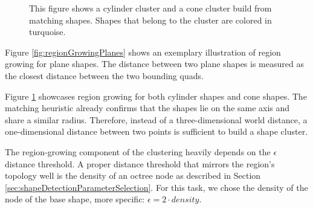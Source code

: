 \begin{figure}
\centering
{}
    \caption[Exemplary cylinder and clone cluster]
        {This figure shows a cylinder cluster and a cone cluster build from matching shapes. Shapes that belong to the cluster are colored in turquoise.}
    \label{fig:regionGrowingConeCylinder}
\end{figure}

Figure \ref{fig:regionGrowingPlanes} shows an exemplary illustration of region growing for plane shapes. The distance between two plane shapes is measured as the closest distance between the two bounding quads.

\par

Figure \ref{fig:regionGrowingConeCylinder} showcases region growing for both cylinder shapes and cone shapes. The matching heuristic already confirms that the shapes lie on the same axis and share a similar radius. Therefore, instead of a three-dimensional world distance, a one-dimensional distance between two points is sufficient to build a shape cluster. 

\par

The region-growing component of the clustering heavily depends on the $\epsilon$ distance threshold. A proper distance threshold that mirrors the region's topology well is the density of an octree node as described in Section \ref{sec:shapeDetectionParameterSelection}. For this task, we chose the density of the node of the base shape, more specific: $\epsilon = 2 \cdot density $.